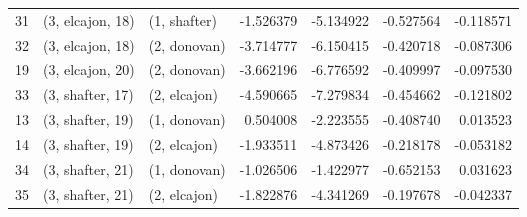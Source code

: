 \begin{tabular}{lllrrrr}
31 &  (3, elcajon, 18) &     (1, shafter) &  -1.526379 &  -5.134922 &  -0.527564 & -0.118571 \\
32 &  (3, elcajon, 18) &     (2, donovan) &  -3.714777 &  -6.150415 &  -0.420718 & -0.087306 \\
19 &  (3, elcajon, 20) &     (2, donovan) &  -3.662196 &  -6.776592 &  -0.409997 & -0.097530 \\
33 &  (3, shafter, 17) &     (2, elcajon) &  -4.590665 &  -7.279834 &  -0.454662 & -0.121802 \\
13 &  (3, shafter, 19) &     (1, donovan) &   0.504008 &  -2.223555 &  -0.408740 &  0.013523 \\
14 &  (3, shafter, 19) &     (2, elcajon) &  -1.933511 &  -4.873426 &  -0.218178 & -0.053182 \\
34 &  (3, shafter, 21) &     (1, donovan) &  -1.026506 &  -1.422977 &  -0.652153 &  0.031623 \\
35 &  (3, shafter, 21) &     (2, elcajon) &  -1.822876 &  -4.341269 &  -0.197678 & -0.042337 \\
\bottomrule
\end{tabular}
